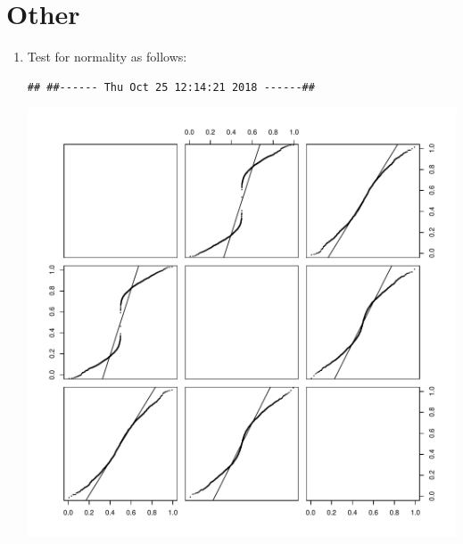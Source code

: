 \documentclass{article}
\begin{document}
\section{Other}
\begin{enumerate}
\item Test for normality as follows:
\begin{knitrout}
\color{fgcolor}\begin{kframe}
\begin{alltt}
\hlstd{()}
\end{alltt}
\begin{verbatim}
## ##------ Thu Oct 25 12:14:21 2018 ------##
\end{verbatim}
\begin{alltt}
\hlstd{(}\hlstd{=}\hlstd{(}\hlstd{,}\hlstd{))}
\hlstd{(}\hlstd{),} \hlstd{=}\hlstd{,} \hlstd{=}\hlstd{)}
\end{alltt}
\end{kframe}
\includegraphics[width=\maxwidth]{figure/unnamed-chunk-7-1} 
\begin{kframe}\begin{alltt}
\hlstd{(}\hlstd{[}\hlopt{:}\hlstd{,]),} \hlstd{=}\hlstd{,} \hlstd{=}\hlstd{,} \hlstd{=}\hlstd{)}
\end{alltt}



\end{kframe}
\end{knitrout}
\end{enumerate}
\end{document}
